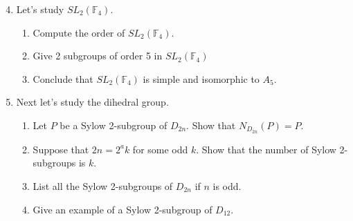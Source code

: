 \documentclass[11pt]{article}
\newcommand{\bF}{\mathbb{F}}
\begin{document}
\begin{enumerate}
  \setcounter{enumi}{3}
  \item{
  Let's study $SL_2(\bF_4)$.
  \begin{enumerate}
    \item{
    Compute the order of $SL_2(\bF_4)$.
    }
    \item{
    Give 2 subgroups of order 5 in $SL_2(\bF_4)$
    }
    \item{
    Conclude that $SL_2(\bF_4)$ is simple and isomorphic to $A_5$.
    }
  \end{enumerate}
  }
\color{black}
  \item{
  Next let's study the dihedral group.
  \begin{enumerate}
    \item{
    Let $P$ be a Sylow 2-subgroup of $D_{2n}$.  Show that $N_{D_{2n}}(P) = P$.
    }
    \item{
    Suppose that $2n = 2^ak$ for some odd $k$.  Show that the number of Sylow 2-subgroups is $k$.
    }
    \item{
    List all the Sylow 2-subgroups of $D_{2n}$ if $n$ is odd.
    }
    \item{
    Give an example of a Sylow 2-subgroup of $D_{12}$.
    }
  \end{enumerate}
  }
\end{enumerate}
\end{document}
